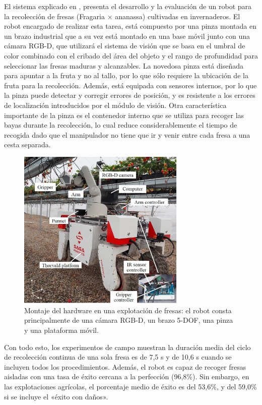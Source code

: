 El sistema explicado en \cite{Xiong19}, presenta el desarrollo y la evaluación de un robot para la recolección de fresas (Fragaria × ananassa) cultivadas en invernaderos. El robot encargado de realizar esta tarea, está compuesto por una pinza montada en un brazo industrial que a su vez está montado en una base móvil junto con una cámara RGB-D, que utilizará el sistema de visión que se basa en el umbral de color combinado con el cribado del área del objeto y el rango de profundidad para seleccionar las fresas maduras y alcanzables. La novedosa pinza está diseñada para apuntar a la fruta y no al tallo, por lo que sólo requiere la ubicación de la fruta para la recolección. Además, está equipada con sensores internos, por lo que la pinza puede detectar y corregir errores de posición, y es resistente a los errores de localización introducidos por el módulo de visión. Otra característica importante de la pinza es el contenedor interno que se utiliza para recoger las bayas durante la recolección, lo cual reduce considerablemente el tiempo de recogida dado que el manipulador no tiene que ir y venir entre cada fresa a una cesta separada.

\begin{figure} [h!]
    \begin{center}
      \includegraphics[width=8cm]{figs/Hardware assembly in a strawberry farm.jpg}
    \end{center}
    \caption{Montaje del hardware en una explotación de fresas: el robot consta principalmente de una cámara RGB-D, un brazo 5-DOF, una pinza y una plataforma móvil.}
    \label{fig:Robot_Xiong}
\end{figure}
\pagebreak

Con todo esto, los experimentos de campo muestran la duración media del ciclo de recolección continua de una sola fresa es de 7,5 s y de 10,6 s cuando se incluyen todos los procedimientos. Además, el robot es capaz de recoger fresas aisladas con una tasa de éxito cercana a la perfección (96,8\%). Sin embargo, en las explotaciones agrícolas, el porcentaje medio de éxito es del 53,6\%, y del 59,0\% si se incluye el «éxito con daños». \\

